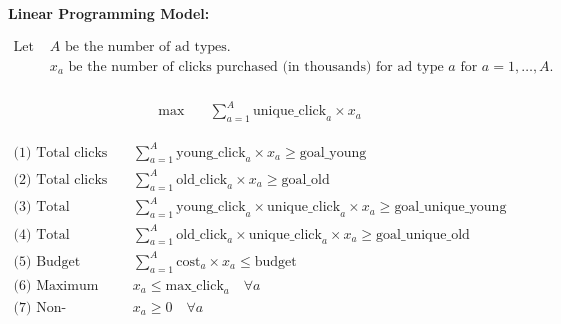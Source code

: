 \documentclass{article}
\begin{document}
\textbf{Linear Programming Model:}

\begin{align*}
  \text{Let } & A \text{ be the number of ad types.} \\
  & x_a \text{ be the number of clicks purchased (in thousands) for ad type } a \text{ for } a = 1, \ldots, A. \\
\end{align*}

\begin{align*}
  \max \quad & \sum_{a=1}^{A} \text{unique\_click}_{a} \times x_a
\end{align*}

\begin{align*}
  \text{(1) Total clicks from young visitors:} & \quad \sum_{a=1}^{A} \text{young\_click}_{a} \times x_a \geq \text{goal\_young} \\
  \text{(2) Total clicks from older visitors:} & \quad \sum_{a=1}^{A} \text{old\_click}_{a} \times x_a \geq \text{goal\_old} \\
  \text{(3) Total unique clicks from young visitors:} & \quad \sum_{a=1}^{A} \text{young\_click}_{a} \times \text{unique\_click}_{a} \times x_a \geq \text{goal\_unique\_young} \\
  \text{(4) Total unique clicks from older visitors:} & \quad \sum_{a=1}^{A} \text{old\_click}_{a} \times \text{unique\_click}_{a} \times x_a \geq \text{goal\_unique\_old} \\
  \text{(5) Budget constraint:} & \quad \sum_{a=1}^{A} \text{cost}_{a} \times x_a \leq \text{budget} \\
  \text{(6) Maximum allowable clicks:} & \quad x_a \leq \text{max\_click}_{a} \quad \forall a \\
  \text{(7) Non-negativity:} & \quad x_a \geq 0 \quad \forall a
\end{align*}
\end{document}
